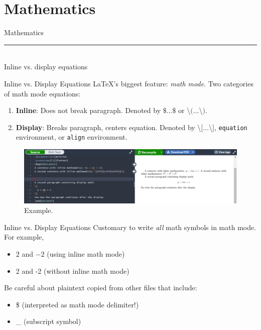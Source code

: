 \documentclass{beamer}
\begin{document}
{  \section{Mathematics}

  \begin{frame}[plain]
    \vfill
    \centering
    \begin{beamercolorbox}[sep=8pt,center,shadow=true,rounded=true]{Mathematics}
      \insertsectionhead\par%
      \color{davisblue}\noindent\rule{10cm}{1pt} \\
      \footnotesize{Inline vs. display equations}
    \end{beamercolorbox}
    \vfill
  \end{frame}

  \begin{frame}{Inline vs. Display Equations}
    \LaTeX's biggest feature: \emph{math mode}. Two categories of math mode equations:
    \begin{enumerate}
      \item \textbf{Inline}: Does not break paragraph. Denoted by $\$\dots\$$ or \textbackslash$(\dots$\textbackslash$)$.
      \item \textbf{Display}: Breaks paragraph, centers equation. Denoted by \textbackslash$[\dots$\textbackslash$]$, \texttt{equation} environment, or \texttt{align} environment.
    \end{enumerate}
    \begin{figure}
      \includegraphics[width=0.9\linewidth]{day02-01A-inline-vs-display.png}
      \caption{Example.}
      \label{fig:day02-01}
    \end{figure}
  \end{frame}

  \begin{frame}{Inline vs. Display Equations}
    Customary to write \emph{all} math symbols in math mode. For example,
    \begin{itemize} 
      \item $2$ and $-2$ (using inline math mode)
      \item 2 and -2 (without inline math mode)
    \end{itemize}
    Be careful about plaintext copied from other files that include:
    \begin{itemize}
      \item \$ (interpreted as math mode delimiter!)
      \item \_ (subscript symbol)
    \end{itemize}
  \end{frame}

}
\end{document}
